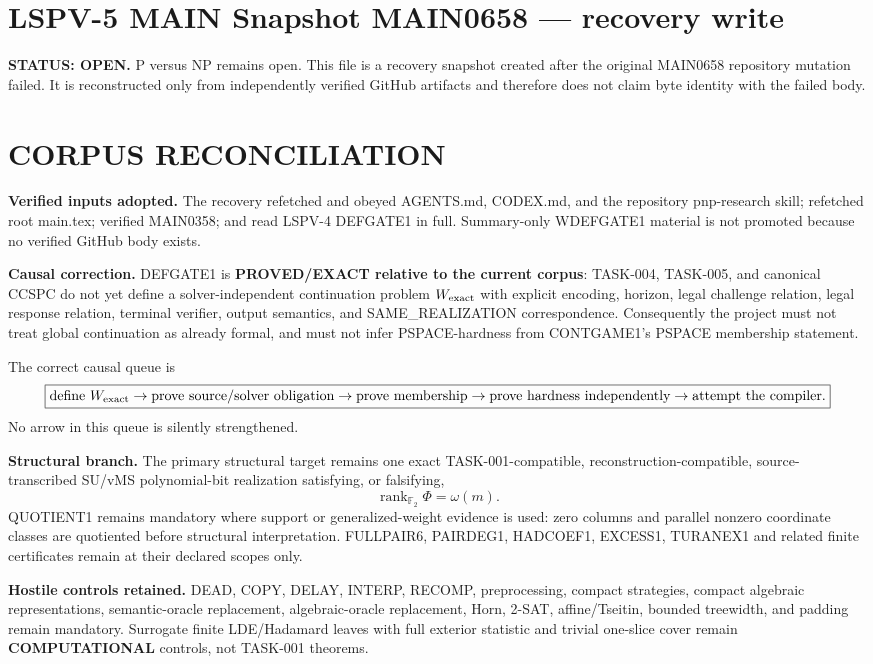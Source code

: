 \documentclass[11pt]{article}
\begin{document}
\section*{LSPV-5 MAIN Snapshot MAIN0658 --- recovery write}
\textbf{STATUS: OPEN.} P versus NP remains open. This file is a recovery snapshot created after the original MAIN0658 repository mutation failed. It is reconstructed only from independently verified GitHub artifacts and therefore does not claim byte identity with the failed body.

\section*{CORPUS RECONCILIATION}
\textbf{Verified inputs adopted.}
The recovery refetched and obeyed AGENTS.md, CODEX.md, and the repository pnp-research skill; refetched root main.tex; verified MAIN0358; and read LSPV-4 DEFGATE1 in full. Summary-only WDEFGATE1 material is not promoted because no verified GitHub body exists.

\textbf{Causal correction.}
DEFGATE1 is \textbf{PROVED/EXACT relative to the current corpus}: TASK-004, TASK-005, and canonical CCSPC do not yet define a solver-independent continuation problem \(W_{\rm exact}\) with explicit encoding, horizon, legal challenge relation, legal response relation, terminal verifier, output semantics, and SAME\_REALIZATION correspondence. Consequently the project must not treat global continuation as already formal, and must not infer PSPACE-hardness from CONTGAME1's PSPACE membership statement.

The correct causal queue is
\[
\boxed{
\text{define }W_{\rm exact}
\to
\text{prove source/solver obligation}
\to
\text{prove membership}
\to
\text{prove hardness independently}
\to
\text{attempt the compiler}.
}
\]
No arrow in this queue is silently strengthened.

\textbf{Structural branch.}
The primary structural target remains one exact TASK-001-compatible, reconstruction-compatible, source-transcribed SU/vMS polynomial-bit realization satisfying, or falsifying,
\[
\boxed{\operatorname{rank}_{\mathbb F_2}\Phi=\omega(m)}.
\]
QUOTIENT1 remains mandatory where support or generalized-weight evidence is used: zero columns and parallel nonzero coordinate classes are quotiented before structural interpretation. FULLPAIR6, PAIRDEG1, HADCOEF1, EXCESS1, TURANEX1 and related finite certificates remain at their declared scopes only.

\textbf{Hostile controls retained.}
DEAD, COPY, DELAY, INTERP, RECOMP, preprocessing, compact strategies, compact algebraic representations, semantic-oracle replacement, algebraic-oracle replacement, Horn, 2-SAT, affine/Tseitin, bounded treewidth, and padding remain mandatory. Surrogate finite LDE/Hadamard leaves with full exterior statistic and trivial one-slice cover remain \textbf{COMPUTATIONAL} controls, not TASK-001 theorems.
\end{document}
